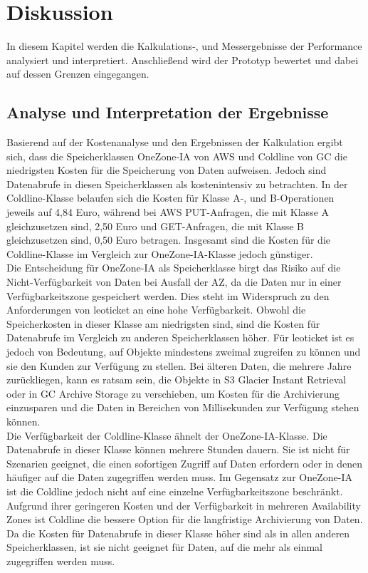 \chapter{Diskussion}

In diesem Kapitel werden die Kalkulations-, und Messergebnisse der Performance analysiert und interpretiert. Anschließend wird der Prototyp bewertet und dabei auf dessen Grenzen eingegangen.
  
\section{Analyse und Interpretation der Ergebnisse}

Basierend auf der Kostenanalyse und den Ergebnissen der Kalkulation ergibt sich, dass die Speicherklassen OneZone-IA von AWS und Coldline von GC die niedrigsten Kosten für die Speicherung von Daten aufweisen. Jedoch sind Datenabrufe in diesen Speicherklassen als kostenintensiv zu betrachten. In der Coldline-Klasse belaufen sich die Kosten für Klasse A-, und B-Operationen jeweils auf 4,84 Euro, während bei AWS PUT-Anfragen, die mit Klasse A gleichzusetzen sind, 2,50 Euro und GET-Anfragen, die mit Klasse B gleichzusetzen sind, 0,50 Euro betragen. Insgesamt sind die Kosten für die Coldline-Klasse im Vergleich zur OneZone-IA-Klasse jedoch günstiger.\\ 

Die Entscheidung für OneZone-IA als Speicherklasse birgt das Risiko auf die Nicht-Verfügbarkeit von Daten bei Ausfall der AZ, da die Daten nur in einer Verfügbarkeitszone gespeichert werden. Dies steht im Widerspruch zu den Anforderungen von leoticket an eine hohe Verfügbarkeit. Obwohl die Speicherkosten in dieser Klasse am niedrigsten sind, sind die Kosten für Datenabrufe im Vergleich zu anderen Speicherklassen höher. Für leoticket ist es jedoch von Bedeutung, auf Objekte mindestens zweimal zugreifen zu können und sie den Kunden zur Verfügung zu stellen. Bei älteren Daten, die mehrere Jahre zurückliegen, kann es ratsam sein, die Objekte in S3 Glacier Instant Retrieval oder in GC Archive Storage zu verschieben, um Kosten für die Archivierung einzusparen und die Daten in Bereichen von Millisekunden zur Verfügung stehen können.\\

Die Verfügbarkeit der Coldline-Klasse ähnelt der OneZone-IA-Klasse. Die Datenabrufe in dieser Klasse können mehrere Stunden dauern. Sie ist nicht für Szenarien geeignet, die einen sofortigen Zugriff auf Daten erfordern oder in denen häufiger auf die Daten zugegriffen werden muss. Im Gegensatz zur OneZone-IA ist die Coldline jedoch nicht auf eine einzelne Verfügbarkeitszone beschränkt. Aufgrund ihrer geringeren Kosten und der Verfügbarkeit in mehreren Availability Zones ist Coldline die bessere Option für die langfristige Archivierung von Daten. Da die Kosten für Datenabrufe in dieser Klasse höher sind als in allen anderen Speicherklassen, ist sie nicht geeignet für Daten, auf die mehr als einmal zugegriffen werden muss.\\

